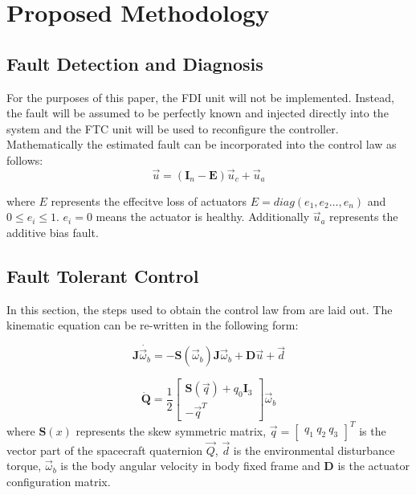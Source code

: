 \section{Proposed Methodology}
\subsection{Fault Detection and Diagnosis}
For the purposes of this paper, the FDI unit will not be implemented. Instead, the fault will be assumed to be perfectly known and injected directly into the system and the FTC unit will be used to reconfigure the controller. Mathematically the estimated fault can be incorporated into the control law as follows:
\begin{equation}\vec{u}=(\mathbf{I}_{n}-\mathbf{E})\vec{u}_{c}+\vec{u}_{a}\end{equation}

where $E$ represents the effecitve loss of actuators $E=diag(e_{1},e_{2}\dots,e_{n})$ and $0\leq e_{i}\leq 1$. $e_{i}=0$ means the actuator is healthy. Additionally $\vec{u}_{a}$ represents the additive bias fault.

\subsection{Fault Tolerant Control}
In this section, the steps used to obtain the control law from \cite{shenActiveFaulttolerantControl2019} are laid out. The kinematic equation can be re-written in the following form:


\begin{equation}\mathbf{J}\dot{\vec{\omega}_{b}}=-\mathbf{S}(\vec{\omega}_{b})\mathbf{J}\vec{\omega}_{b}+\mathbf{D}\vec{u}+\vec{d}\end{equation}

\begin{equation} \dot{\mathbf{Q}}=\frac{1}{2}\begin{bmatrix}
\mathbf{S}(\vec{q})+q_{0}\mathbf{I}_{3} \\
-\vec{q}^{T}
\end{bmatrix} \vec{\omega}_{b}\end{equation}
where $\mathbf{S}(x)$ represents the skew symmetric matrix, 
$\vec{q}=\begin{bmatrix}q_{1} \ q_{2} \ q_{3} \end{bmatrix}^T$ is the vector part of the spacecraft quaternion $\vec{Q}$,
$\vec{d}$ is the environmental disturbance torque,
$\vec{\omega}_{b}$ is the body angular velocity in body fixed frame and
$\mathbf{D}$ is the actuator configuration matrix.

